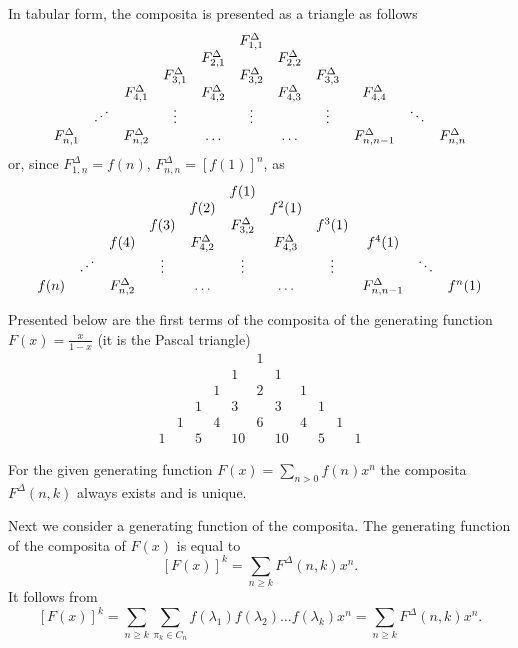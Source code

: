 \documentclass[12pt]{article}
\begin{document}
In tabular form, the composita is presented as a triangle as follows
$$
\begin{array}{ccccccccccc}
&&&&& F_{1,1}^{\Delta}\\
&&&& F_{2,1}^{\Delta} && F_{2,2}^{\Delta}\\
&&& F_{3,1}^{\Delta} && F_{3,2}^{\Delta} && F_{3,3}^{\Delta}\\
&& F_{4,1}^{\Delta} && F_{4,2}^{\Delta} && F_{4,3}^{\Delta} && F_{4,4}^{\Delta}\\
& \rdots && \vdots && \vdots && \vdots && \ddots\\
F_{n,1}^{\Delta} && F_{n,2}^{\Delta} && \ldots && \ldots && F_{n,n-1}^{\Delta} && F_{n,n}^{\Delta}\\
\end{array}
$$
or, since $F_{1,n}^{\Delta}=f(n)$, $F_{n,n}^{\Delta}={[f(1)]}^n$, as
$$
\begin{array}{ccccccccccc}
&&&&& f(1)\\
&&&& f(2) && f^2(1)\\
&&& f(3) && F_{3,2}^{\Delta} && f^3(1)\\
&& f(4) && F_{4,2}^{\Delta} && F_{4,3}^{\Delta} && f^4(1)\\
& \rdots && \vdots && \vdots && \vdots && \ddots\\
f(n) && F_{n,2}^{\Delta} && \ldots && \ldots && F_{n,n-1}^{\Delta} && f^n(1)\\
\end{array}
$$ 

Presented below are the first terms of the composita of the generating function $F(x)=\frac{x}{1-x}$ (it is the Pascal triangle)
$$
\begin{array}{ccccccccccc}
&&&&&1\\
&&&& 1 && 1\\
&&& 1 && 2 && 1\\
&& 1 && 3 && 3 && 1\\
& 1 && 4 && 6 && 4 && 1\\
1 && 5 && 10 && 10 && 5 && 1
\end{array}
$$

For the given generating function $F(x)=\sum_{n>0}{f(n)x^n}$ the composita $F^{\Delta}(n,k)$ always exists and is unique.

Next we consider a generating function of the composita. 
The generating function of the composita of $F(x)$ is equal to
\begin{equation}
\label{GenComp}
[F(x)]^k=\sum_{n\geq k}F^{\Delta}(n,k)x^n.
\end{equation} 
It follows from 
$$
[F(x)]^k=\sum_{n\geq  k}\sum_{\pi_k \in C_n}{f(\lambda_1)f(\lambda_2)\ldots f(\lambda_k)}x^n=\sum_{n\geq  k}F^{\Delta}(n,k)x^n. 
$$
\end{document}
